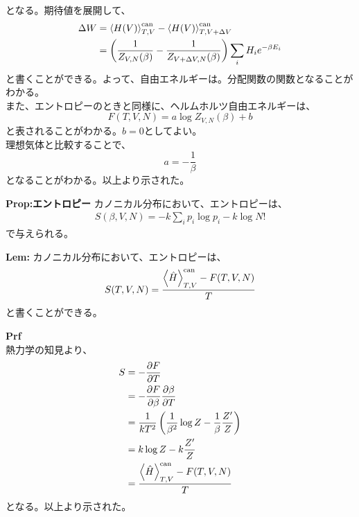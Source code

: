 \documentclass[a4paper,11pt]{jsarticle}
\numberwithin{equation}{section}
\begin{document}
となる。期待値を展開して、
\begin{align}
  \Delta W &= \ev{H(V)}_{T,V}^{\text{can}} - \ev{H(V)}_{T,V+\Delta V}^{\text{can}}\\
  &= \left(\frac{1}{Z_{V,N}(\beta)}-\frac{1}{Z_{V+\Delta V,N}(\beta)}\right)\sum_{i}H_i e^{-\beta E_i}
\end{align}
と書くことができる。よって、自由エネルギーは。分配関数の関数となることがわかる。\\
また、エントロピーのときと同様に、ヘルムホルツ自由エネルギーは、
\begin{equation}
  F(T,V,N) = a\log Z_{V,N}(\beta) + b
\end{equation}
と表されることがわかる。$b=0$としてよい。\\
理想気体と比較することで、
\begin{equation}
  a = -\frac{1}{\beta}
\end{equation}
となることがわかる。以上より示された。\hfill\qedsymbol\\


\begin{itembox}[l]{\textbf{Prop:エントロピー}}
  カノニカル分布において、エントロピーは、
  \begin{align}
    S(\beta,V,N) = -k\sum_{i}p_{i}\log p_{i} -k\log N!
  \end{align}
  で与えられる。

\end{itembox}

\begin{itembox}[l]{\textbf{Lem:}}
  カノニカル分布において、エントロピーは、
  \begin{align}
    S(T,V,N) = \frac{\ev{\hat{H}}_{T,V}^{\text{can}} - F(T,V,N)}{T}
  \end{align}
  と書くことができる。

\end{itembox}
\textbf{Prf}\\
熱力学の知見より、
\begin{align}
  S &= -\pdv{F}{T}\\
  &= -\pdv{F}{\beta}\pdv{\beta}{T}\\
  &= \frac{1}{kT^2}\left(\frac{1}{\beta^2}\log Z -\frac{1}{\beta}\frac{Z'}{Z} \right)\\
  &= k\log Z -k\frac{Z'}{Z}\\
  &= \frac{\ev{\hat{H}}_{T,V}^{\text{can}} - F(T,V,N)}{T}
\end{align}
となる。以上より示された。\hfill\qedsymbol\\
\end{document}
